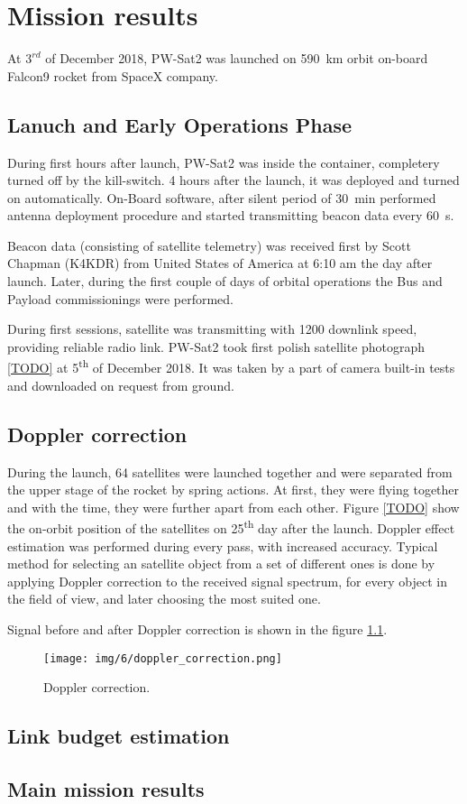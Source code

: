 \chapter{Mission results}
At $3^{rd}$ of December 2018, PW-Sat2 was launched on \SI{590}{\kilo\meter} orbit on-board Falcon9 rocket from SpaceX company. 

\section{Lanuch and Early Operations Phase}
During first hours after launch, PW-Sat2 was inside the container, completery turned off by the kill-switch. 4 hours after the launch, it was deployed and turned on automatically. On-Board software, after silent period of \SI{30}{\minute} performed antenna deployment procedure and started transmitting beacon data every \SI{60}{\second}.

Beacon data (consisting of satellite telemetry) was received first by Scott Chapman (K4KDR) from United States of America at 6:10 am the day after launch. Later, during the first couple of days of orbital operations the Bus and Payload commissionings were performed.

During first sessions, satellite was transmitting with \SI{1200}{\bps} downlink speed, providing reliable radio link. PW-Sat2 took first polish satellite photograph \ref{TODO} at \si{5^{th}} of December 2018. It was taken by a part of camera built-in tests and downloaded on request from ground.


\section{Doppler correction}
During the launch, \si{64} satellites were launched together and were separated from the upper stage of the rocket by spring actions. At first, they were flying together and with the time, they were further apart from each other. Figure \ref{TODO} show the on-orbit position of the satellites on \si{25^{th}} day after the launch. Doppler effect estimation was performed during every pass, with increased accuracy. Typical method for selecting an satellite object from a set of different ones is done by applying Doppler correction to the received signal spectrum, for every object in the field of view, and later choosing the most suited one. 

Signal before and after Doppler correction is shown in the figure \ref{Doppler_correction_gqrx}.

\begin{figure}
    \centering
    \texttt{[image: img/6/doppler\_correction.png]}
    \caption{Doppler correction.}
    \label{Doppler_correction_gqrx}
\end{figure}

\section{Link budget estimation}


\section{Main mission results}


